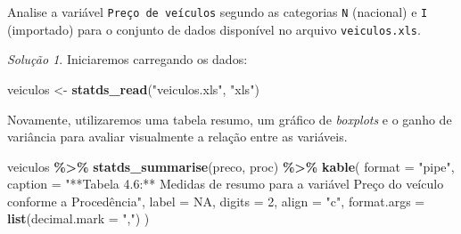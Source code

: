 \documentclass[
]{latex/krantz}
\newenvironment{Shaded}{\begin{snugshade}}{\end{snugshade}}
\newcommand{\AttributeTok}[1]{\textcolor[rgb]{0.13,0.29,0.53}{#1}}
\newcommand{\ConstantTok}[1]{\textcolor[rgb]{0.56,0.35,0.01}{#1}}
\newcommand{\DecValTok}[1]{\textcolor[rgb]{0.00,0.00,0.81}{#1}}
\newcommand{\FunctionTok}[1]{\textcolor[rgb]{0.13,0.29,0.53}{\textbf{#1}}}
\newcommand{\NormalTok}[1]{#1}
\newcommand{\OtherTok}[1]{\textcolor[rgb]{0.56,0.35,0.01}{#1}}
\newcommand{\SpecialCharTok}[1]{\textcolor[rgb]{0.81,0.36,0.00}{\textbf{#1}}}
\newcommand{\StringTok}[1]{\textcolor[rgb]{0.31,0.60,0.02}{#1}}
\theoremstyle{definition}
\theoremstyle{definition}
\theoremstyle{definition}
\theoremstyle{definition}
\theoremstyle{remark}
\newtheorem*{solution}{Solução}
\begin{document}
Analise a variável \texttt{Preço\ de\ veículos} segundo as categorias \texttt{N} (nacional) e \texttt{I} (importado) para o conjunto de dados disponível no arquivo \texttt{veiculos.xls}.

\begin{solution}
Iniciaremos carregando os dados:

\begin{Shaded}
\begin{Highlighting}[]
\NormalTok{veiculos }\OtherTok{\textless{}{-}} \FunctionTok{statds\_read}\NormalTok{(}\StringTok{"veiculos.xls"}\NormalTok{, }\StringTok{"xls"}\NormalTok{)}
\end{Highlighting}
\end{Shaded}

Novamente, utilizaremos uma tabela resumo, um gráfico de \emph{boxplots} e o ganho de variância para avaliar visualmente a relação entre as variáveis.

\begin{Shaded}
\begin{Highlighting}[]
\NormalTok{veiculos }\SpecialCharTok{\%\textgreater{}\%}
  \FunctionTok{statds\_summarise}\NormalTok{(preco, proc) }\SpecialCharTok{\%\textgreater{}\%}
  \FunctionTok{kable}\NormalTok{(}
    \AttributeTok{format =} \StringTok{"pipe"}\NormalTok{,}
    \AttributeTok{caption =} \StringTok{"**Tabela 4.6:** Medidas de resumo para a variável \textasciigrave{}Preço do veículo\textasciigrave{} conforme a \textasciigrave{}Procedência\textasciigrave{}"}\NormalTok{,}
    \AttributeTok{label =} \ConstantTok{NA}\NormalTok{,}
    \AttributeTok{digits =} \DecValTok{2}\NormalTok{,}
    \AttributeTok{align =} \StringTok{"c"}\NormalTok{,}
    \AttributeTok{format.args =} \FunctionTok{list}\NormalTok{(}\AttributeTok{decimal.mark =} \StringTok{","}\NormalTok{)}
\NormalTok{  )}
\end{Highlighting}
\end{Shaded}


\end{solution}
\end{document}
